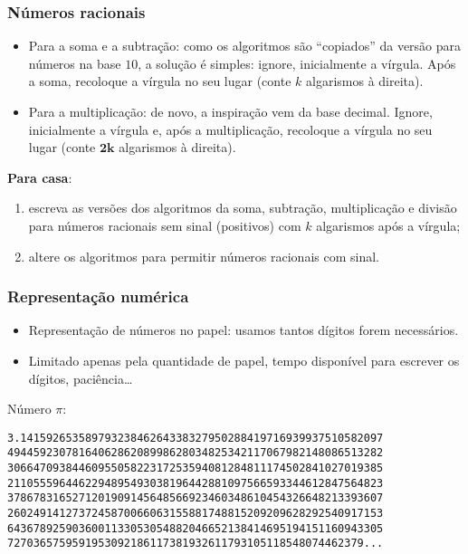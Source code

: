 \documentclass{beamer}
\begin{document}
\begin{frame}[fragile]
\frametitle{Números racionais}

\begin{itemize}
\item Para a soma e a subtração: como os algoritmos são ``copiados'' da versão para números na base $10$, a solução é simples: ignore, inicialmente a vírgula. Após a soma, recoloque a vírgula no seu lugar (conte $k$ algarismos à direita).
\pause
\item Para a multiplicação: de novo, a inspiração vem da base decimal. Ignore, inicialmente a vírgula e, após a multiplicação, recoloque a vírgula no seu lugar (conte $\mathbf{2k}$ algarismos à direita).

\end{itemize}

\textbf{Para casa}:
\begin{enumerate}[(1)]
\item escreva as versões dos algoritmos da soma, subtração, multiplicação e divisão para números racionais sem sinal (positivos) com $k$ algarismos após a vírgula;
\item altere os algoritmos para permitir números racionais com sinal.
\end{enumerate}

\end{frame}

\begin{frame}[fragile]
\frametitle{Representação numérica}

\begin{itemize}
\item Representação de números no papel: usamos tantos dígitos forem necessários.
\item Limitado apenas pela quantidade de papel, tempo disponível para escrever os dígitos, paciência\ldots
\end{itemize}

\pause

Número $\pi$:

\begin{Verbatim}[commandchars=\\\{\},codes={\catcode`$=3\catcode`^=7}]
3.14159265358979323846264338327950288419716939937510582097
4944592307816406286208998628034825342117067982148086513282
3066470938446095505822317253594081284811174502841027019385
2110555964462294895493038196442881097566593344612847564823
3786783165271201909145648566923460348610454326648213393607
2602491412737245870066063155881748815209209628292540917153
6436789259036001133053054882046652138414695194151160943305
7270365759591953092186117381932611793105118548074462379...
\end{Verbatim}

\end{frame}
\end{document}
